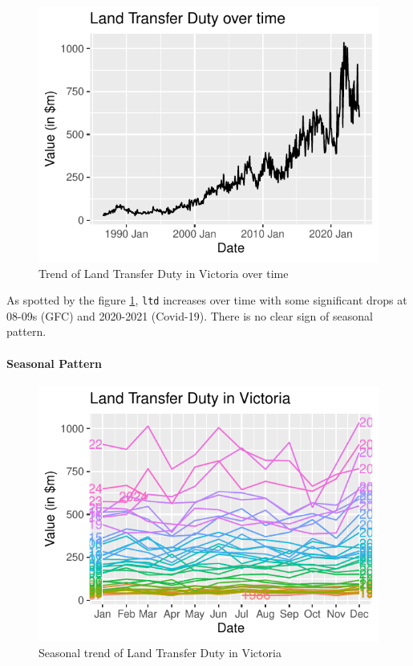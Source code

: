 \documentclass[11pt,a4paper,]{article}
\begin{document}
\begin{figure}[H]

{\centering \includegraphics{Final_Report_files/figure-latex/trend-1} 

}

\caption{Trend of Land Transfer Duty in Victoria over time}\label{fig:trend}
\end{figure}

As spotted by the figure \ref{fig:trend}, \texttt{ltd} increases over time with some significant drops at 08-09s (GFC) and 2020-2021 (Covid-19). There is no clear sign of seasonal pattern.

\paragraph{Seasonal Pattern}\label{seasonal-pattern}

\begin{figure}[H]

{\centering \includegraphics{Final_Report_files/figure-latex/sspattern-1} 

}

\caption{Seasonal trend of Land Transfer Duty in Victoria}\label{fig:sspattern}
\end{figure}
\end{document}
